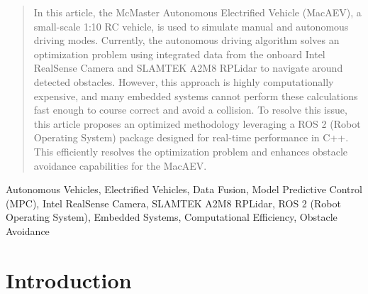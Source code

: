 \documentclass[conference]{IEEEtran}
\begin{document}
\begin{abstract}
In this article, the McMaster Autonomous Electrified Vehicle (MacAEV), a small-scale 1:10 RC vehicle, is used to simulate manual and autonomous driving modes. Currently, the autonomous driving algorithm solves an optimization problem using integrated data from the onboard Intel RealSense Camera and SLAMTEK A2M8 RPLidar to navigate around detected obstacles. However, this approach is highly computationally expensive, and many embedded systems cannot perform these calculations fast enough to course correct and avoid a collision. To resolve this issue, this article proposes an optimized methodology leveraging a ROS 2 (Robot Operating System) package designed for real-time performance in C++. This efficiently resolves the optimization problem and enhances obstacle avoidance capabilities for the MacAEV. 




\end{abstract}

\begin{IEEEkeywords}
Autonomous Vehicles, Electrified Vehicles, Data Fusion, Model Predictive Control (MPC),
Intel RealSense Camera, SLAMTEK A2M8 RPLidar, ROS 2 (Robot Operating System), Embedded Systems,
Computational Efficiency, Obstacle Avoidance
\end{IEEEkeywords}

\section{Introduction}



\end{document}
